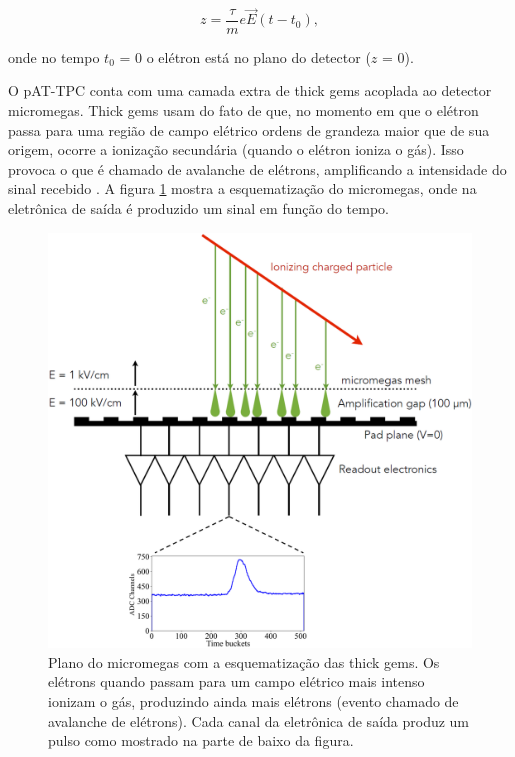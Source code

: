 \documentclass[a4paper,12pt,oneside]{book}
\begin{document}
\begin{equation}
    z = \frac{\tau}{m}e\vec{E}(t - t_0),
\end{equation}

onde no tempo $t_0$ = 0 o elétron está no plano do detector ($z$ = 0).

\par O pAT-TPC conta com uma camada extra de thick gems acoplada ao detector micromegas. Thick gems usam do fato de que, no momento em que o elétron passa para uma região de campo elétrico ordens de grandeza maior que de sua origem, ocorre a ionização secundária (quando o elétron ioniza o gás). Isso provoca o que é chamado de avalanche de elétrons, amplificando a intensidade do sinal recebido \cite{GET}. A figura \ref{fig:thick_gems} mostra a esquematização do micromegas, onde na eletrônica de saída é produzido um sinal em função do tempo.

\begin{figure}[H]
    \centering
    \includegraphics[scale = 0.40]{figs/thick_gems_2.png}
    \caption{Plano do micromegas com a esquematização das thick gems. Os elétrons quando passam para um campo elétrico mais intenso ionizam o gás, produzindo ainda mais elétrons (evento chamado de avalanche de elétrons). Cada canal da eletrônica de saída produz um pulso como mostrado na parte de baixo da figura.}
    \label{fig:thick_gems}
\end{figure}
\end{document}

